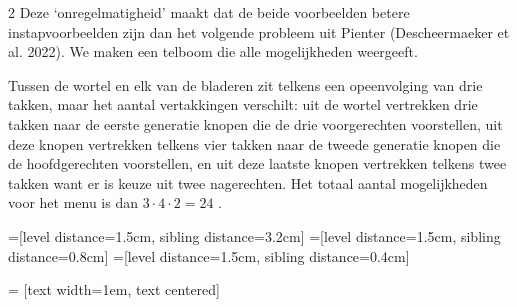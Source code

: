 \begin{multicols}{2}
Deze ‘onregelmatigheid’ maakt dat de beide voorbeelden betere instapvoorbeelden zijn dan het volgende probleem uit Pienter (Descheermaeker et al. 2022). 
We maken een telboom die alle mogelijkheden weergeeft.

Tussen de wortel en elk van de bladeren zit telkens een opeenvolging van drie takken, maar het aantal vertakkingen verschilt: uit de wortel vertrekken drie takken naar de eerste generatie knopen die de drie voorgerechten voorstellen, uit deze knopen vertrekken telkens vier takken naar de tweede generatie knopen die de hoofdgerechten voorstellen, en uit deze laatste knopen vertrekken telkens twee takken want er is keuze uit twee nagerechten. Het totaal aantal mogelijkheden voor het menu is dan $3\cdot4\cdot2=24$ .

\begin{afbeeldingenv}
=[level distance=1.5cm, sibling distance=3.2cm]
=[level distance=1.5cm, sibling distance=0.8cm]
=[level distance=1.5cm, sibling distance=0.4cm]

 = [text width=1em, text centered]


\end{afbeeldingenv}
\end{multicols}
